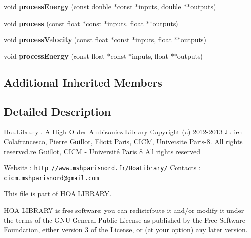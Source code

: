 \begin{DoxyCompactItemize}
\item 
\hypertarget{class_ambisonic_vector_ad8a21b27864999d7d4c59a199bcc07ef}{void {\bfseries process\-Energy} (const double $\ast$const $\ast$inputs, double $\ast$$\ast$outputs)}\label{class_ambisonic_vector_ad8a21b27864999d7d4c59a199bcc07ef}

\item 
\hypertarget{class_ambisonic_vector_a24ad1309b22b3b91bc148f8c066d75c7}{void {\bfseries process} (const float $\ast$const $\ast$inputs, float $\ast$$\ast$outputs)}\label{class_ambisonic_vector_a24ad1309b22b3b91bc148f8c066d75c7}

\item 
\hypertarget{class_ambisonic_vector_a08d22321578374ad7f99fc9ff9323aa0}{void {\bfseries process\-Velocity} (const float $\ast$const $\ast$inputs, float $\ast$$\ast$outputs)}\label{class_ambisonic_vector_a08d22321578374ad7f99fc9ff9323aa0}

\item 
\hypertarget{class_ambisonic_vector_ae9758b735e9bd57e2f2c3b21d1350e3b}{void {\bfseries process\-Energy} (const float $\ast$const $\ast$inputs, float $\ast$$\ast$outputs)}\label{class_ambisonic_vector_ae9758b735e9bd57e2f2c3b21d1350e3b}

\end{DoxyCompactItemize}
\subsection*{Additional Inherited Members}


\subsection{Detailed Description}
\hyperlink{interface_hoa_library}{Hoa\-Library} \-: A High Order Ambisonics Library Copyright (c) 2012-\/2013 Julien Colafrancesco, Pierre Guillot, Eliott Paris, C\-I\-C\-M, Universite Paris-\/8. All rights reserved.\-re Guillot, C\-I\-C\-M -\/ Université Paris 8 All rights reserved.

Website \-: \href{http://www.mshparisnord.fr/HoaLibrary/}{\tt http\-://www.\-mshparisnord.\-fr/\-Hoa\-Library/} Contacts \-: \href{mailto:cicm.mshparisnord@gmail.com}{\tt cicm.\-mshparisnord@gmail.\-com}

This file is part of H\-O\-A L\-I\-B\-R\-A\-R\-Y.

H\-O\-A L\-I\-B\-R\-A\-R\-Y is free software\-: you can redistribute it and/or modify it under the terms of the G\-N\-U General Public License as published by the Free Software Foundation, either version 3 of the License, or (at your option) any later version.

